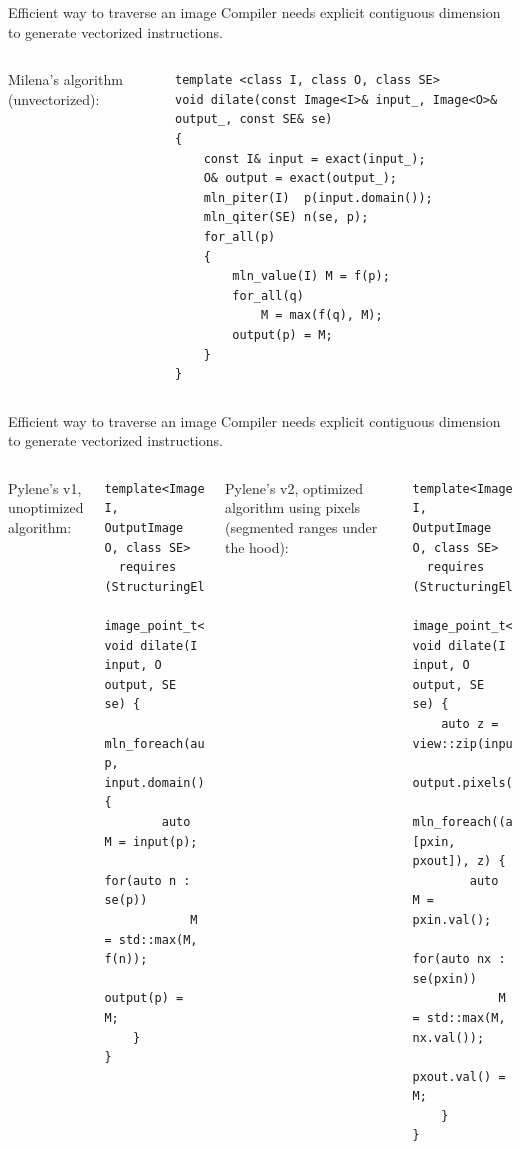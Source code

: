\documentclass[12pt,aspectratio=169]{beamer}
\begin{document}
\begin{frame}[fragile]{Efficient way to traverse an image}
  Compiler needs explicit contiguous dimension to generate vectorized instructions.
  \begin{columns}[T,onlytextwidth]
    Milena's algorithm (unvectorized):
    \begin{verbatim}
template <class I, class O, class SE>
void dilate(const Image<I>& input_, Image<O>& output_, const SE& se)
{
    const I& input = exact(input_);
    O& output = exact(output_);
    mln_piter(I)  p(input.domain());
    mln_qiter(SE) n(se, p);
    for_all(p)
    {
        mln_value(I) M = f(p);
        for_all(q)
            M = max(f(q), M);
        output(p) = M;
    }
}
    \end{verbatim}
    
  \end{columns}
\end{frame}

\begin{frame}[fragile]{Efficient way to traverse an image}
  Compiler needs explicit contiguous dimension to generate vectorized instructions.
  \begin{columns}[T,onlytextwidth]
    Pylene's v1, unoptimized algorithm:
    \begin{verbatim}
template<Image I, OutputImage O, class SE>
  requires (StructuringElement<SE,
              image_point_t<I>>)
void dilate(I input, O output, SE se) {
    mln_foreach(auto p, input.domain()) {
        auto M = input(p);
        for(auto n : se(p))
            M = std::max(M, f(n));
        output(p) = M;
    }
}
    \end{verbatim}
    Pylene's v2, optimized algorithm using pixels (segmented ranges under the hood):
    \begin{verbatim}
template<Image I, OutputImage O, class SE>
  requires (StructuringElement<SE,
              image_point_t<I>>)
void dilate(I input, O output, SE se) {
    auto z = view::zip(input.pixels(),
                output.pixels());
    mln_foreach((auto [pxin, pxout]), z) {
        auto M = pxin.val();
        for(auto nx : se(pxin))
            M = std::max(M, nx.val());
        pxout.val() = M;
    }
}
    \end{verbatim}
  \end{columns}
\end{frame}
\end{document}
